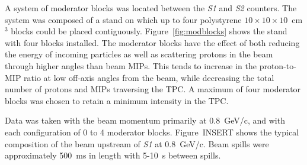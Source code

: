 A system of moderator blocks was located between the \textit{S1} and \textit{S2} counters.
The system was composed of a stand on which up to four polystyrene $10\times10\times10$~cm$^3$ blocks could be placed contiguously.
Figure~\ref{fig:modblocks} shows the stand with four blocks installed.
The moderator blocks have the effect of both reducing the energy of incoming particles as well as scattering protons in the beam through higher angles than beam MIPs.
This tends to increase in the proton-to-MIP ratio at low off-axis angles from the beam, while decreasing the total number of protons and MIPs traversing the TPC.
A maximum of four moderator blocks was chosen to retain a minimum intensity in the TPC.

Data was taken with the beam momentum primarily at 0.8~GeV/c, and with each configuration of 0 to 4 moderator blocks.
Figure~INSERT shows the typical composition of the beam upstream of \textit{S1} at 0.8~GeV/c. Beam spills were approximately 500~ms in length with 5-10~s between spills.  



